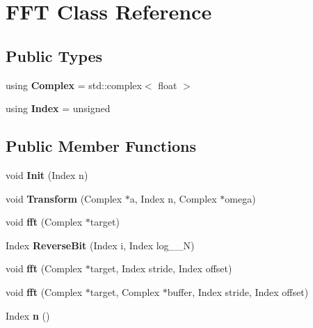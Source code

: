 \hypertarget{class_f_f_t}{}\section{F\+FT Class Reference}
\label{class_f_f_t}
\subsection*{Public Types}
\begin{DoxyCompactItemize}
\item 
\mbox{\label{class_f_f_t_aaabbb247b9447fb4352c9b7e4edee888}} 
using {\bfseries Complex} = std\+::complex$<$ float $>$
\item 
\mbox{\label{class_f_f_t_a1031a34209b9044849fe931e9850cda8}} 
using {\bfseries Index} = unsigned
\end{DoxyCompactItemize}
\subsection*{Public Member Functions}
\begin{DoxyCompactItemize}
\item 
\mbox{\label{class_f_f_t_a17ecdd0aae90da67411fbd1e60f1dd0b}} 
void {\bfseries Init} (Index n)
\item 
\mbox{\label{class_f_f_t_a5caf0144fe9c7fe51667719b5cce23a0}} 
void {\bfseries Transform} (Complex $\ast$a, Index n, Complex $\ast$omega)
\item 
\mbox{\label{class_f_f_t_a37c96740308ce1d207d49ff6ecdd3b79}} 
void {\bfseries fft} (Complex $\ast$target)
\item 
\mbox{\label{class_f_f_t_a4054eca78f8f87a1a803a587a932d88e}} 
Index {\bfseries Reverse\+Bit} (Index i, Index log\+\_\+\_\+N)
\item 
\mbox{\label{class_f_f_t_ac3d4443716e0c91f39505d60fdd90875}} 
void {\bfseries fft} (Complex $\ast$target, Index stride, Index offset)
\item 
\mbox{\label{class_f_f_t_a15c81111218f3d870b151cd086d02ee3}} 
void {\bfseries fft} (Complex $\ast$target, Complex $\ast$buffer, Index stride, Index offset)
\item 
\mbox{\label{class_f_f_t_a3dda654f9688a733515b9e6a5e03080d}} 
Index {\bfseries n} ()
\end{DoxyCompactItemize}


